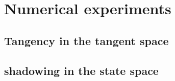 

\section{Numerical experiments}

\subsection{Tangency in the tangent space}

\subsection{shadowing in the state space }
